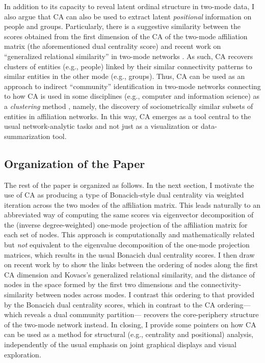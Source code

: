 \documentclass[a4paper,fleqn]{cas-sc}
\begin{document}
In addition to its capacity to reveal latent ordinal structure in two-mode data, I also argue that CA can also be used to extract latent \textit{positional} information on people and groups. Particularly, there is a suggestive similarity between the scores obtained from the first dimension of the CA of the two-mode affiliation matrix (the aforementioned dual centrality score) and recent work on ``generalized relational similarity'' in two-mode networks \citep{kovacs2010generalized, lizardo2024two}. As such, CA recovers clusters of entities (e.g., people) linked by their similar connectivity patterns to similar entities in the other mode (e.g., groups). Thus, CA can be used as an approach to indirect ``community'' identification in two-mode networks connecting to how CA is used in some disciplines (e.g., computer and information science) as a \textit{clustering} method \citep{zha2001bipartite}, namely, the discovery of sociometrically similar subsets of entities in affiliation networks. In this way, CA emerges as a tool central to the usual network-analytic tasks and not just as a visualization or data-summarization tool.

\subsection{Organization of the Paper} \label{subsec:org}
The rest of the paper is organized as follows. In the next section, I motivate the use of CA as producing a type of Bonacich-style dual centrality via weighted iteration across the two modes of the affiliation matrix. This leads naturally to an abbreviated way of computing the same scores via eigenvector decomposition of the (inverse degree-weighted) one-mode projection of the affiliation matrix for each set of nodes. This approach is computationally and mathematically related but \textit{not} equivalent to the eigenvalue decomposition of the one-mode projection matrices, which results in the usual Bonacich dual centrality scores. I then draw on recent work by \citet{van2021correspondence} to show the links between the ordering of nodes along the first CA dimension and Kovacs's generalized relational similarity, and the distance of nodes in the space formed by the first two dimensions and the connectivity-similarity between nodes across modes. I contrast this ordering to that provided by the Bonacich dual centrality scores, which in contrast to the CA ordering---which reveals a dual community partition--- recovers the core-periphery structure of the two-mode network instead. In closing, I provide some pointers on how CA can be used as a method for structural (e.g., centrality and positional) analysis, independently of the usual emphasis on joint graphical displays and visual exploration. 
\end{document}
